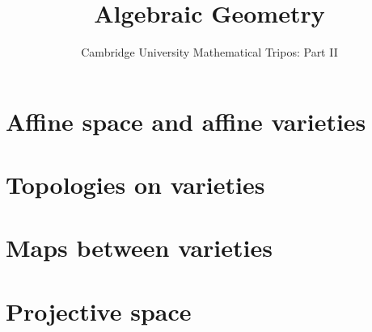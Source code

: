 \documentclass{article}
\title{Algebraic Geometry}
\author{Cambridge University Mathematical Tripos: Part II}
\begin{document}
\maketitle

\tableofcontentsnewpage{}


\section{Affine space and affine varieties}

\section{Topologies on varieties}

\section{Maps between varieties}

\section{Projective space}

\end{document}

